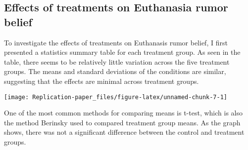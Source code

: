 \documentclass[AER]{AEA}
\begin{document}
\hypertarget{effects-of-treatments-on-euthanasia-rumor-belief}{%
\subsection{Effects of treatments on Euthanasia rumor
belief}\label{effects-of-treatments-on-euthanasia-rumor-belief}}

\begin{table}

\caption{\label{tab:t test}Effects of rumor on treatments}
\centering
{}
\end{table}

To investigate the effects of treatments on Euthanasis rumor belief, I
first presented a statistics summary table for each treatment group. As
seen in the table, there seems to be relatively little variation across
the five treatment groups. The means and standard deviations of the
conditions are similar, suggesting that the effects are minimal across
treatment groups.

\begin{center}\texttt{[image: Replication-paper\_files/figure-latex/unnamed-chunk-7-1]} \end{center}

One of the most common methods for comparing means is t-test, which is
also the method Berinsky used to compared treatment group means. As the
graph shows, there was not a significant difference between the control
and treatment groups.
\end{document}
